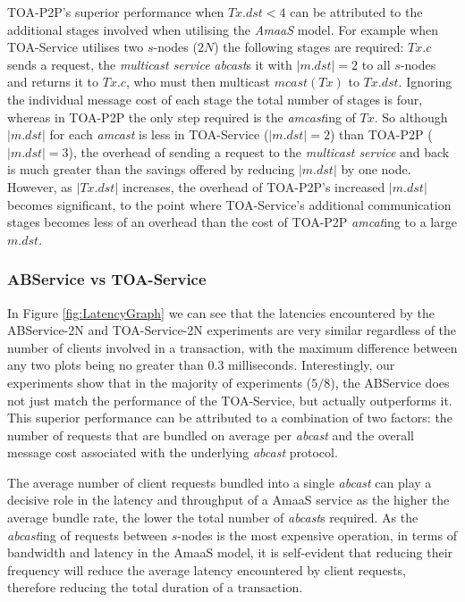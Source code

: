 	TOA-P2P's superior performance when $Tx.dst < 4$ can be attributed to the additional stages involved when utilising the \emph{AmaaS} model.  For example when TOA-Service utilises two $s$-nodes ($2N$) the following stages are required: $Tx.c$ sends a request, the \emph{multicast service} \emph{abcast}s it with $|m.dst| = 2$ to all $s$-nodes and returns it to $Tx.c$, who must then multicast $mcast(Tx)$ to $Tx.dst$.  Ignoring the individual message cost of each stage the total number of stages is four, whereas in TOA-P2P the only step required is the \emph{amcast}ing of $Tx$.  So although $|m.dst|$ for each \emph{amcast} is less in TOA-Service ($|m.dst| = 2$) than TOA-P2P ($|m.dst| = 3$), the overhead of sending a request to the \emph{multicast service} and back is much greater than the savings offered by reducing $|m.dst|$ by one node.  However, as $|Tx.dst|$ increases, the overhead of TOA-P2P's increased $|m.dst|$ becomes significant, to the point where TOA-Service's additional communication stages becomes less of an overhead than the cost of TOA-P2P \emph{amcat}ing to a large $m.dst$.  
	
    \subsubsection*{ABService vs TOA-Service}
    In Figure \ref{fig:LatencyGraph} we can see that the latencies encountered by the ABService-2N and TOA-Service-2N experiments are very similar regardless of the number of clients involved in a transaction, with the maximum difference between any two plots being no greater than $0.3$ milliseconds.  Interestingly, our experiments show that in the majority of experiments ($5/8$), the ABService does not just match the performance of the TOA-Service, but actually outperforms it.  This superior performance can be attributed to a combination of two factors: the number of requests that are bundled on average per \emph{abcast} and the overall message cost associated with the underlying \emph{abcast} protocol.  
    
    The average number of client requests bundled into a single \emph{abcast} can play a decisive role in the latency and throughput of a \textsf{AmaaS} service as the higher the average bundle rate, the lower the total number of \emph{abcast}s required.  As the \emph{abcast}ing of requests between $s$-nodes is the most expensive operation, in terms of bandwidth and latency in the \textsf{AmaaS} model, it is self-evident that reducing their frequency will reduce the average latency encountered by client requests, therefore reducing the total duration of a transaction.  
    
